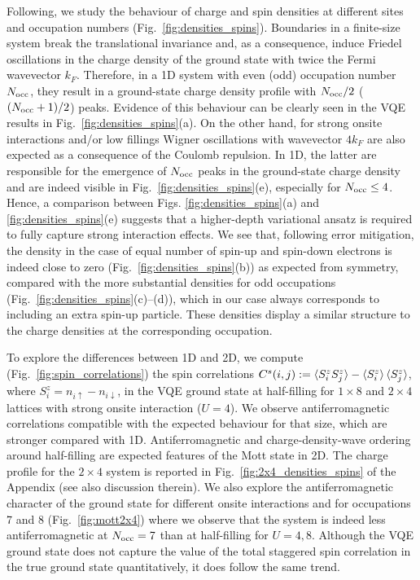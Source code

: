 \documentclass[aps,prb,twoside,superscriptaddress,longbibliography,nofootinbib,floatfix, notitlepage,twocolumn]{revtex4-1}
\newcommand{\Nocc}{N_{\rm{occ}}}
\begin{document}
Following, we study the behaviour of charge and spin densities at different sites and occupation numbers (Fig.~\ref{fig:densities_spins}). Boundaries in a finite-size system break the translational invariance and, as a consequence, induce Friedel oscillations in the charge density of the ground state\cite{Friedel1958} with twice the Fermi wavevector $k_F$. Therefore, in a 1D system with even (odd) occupation number $\Nocc$, they result in a ground-state charge density profile with $\Nocc/2$ ($(\Nocc+1)/2$) peaks. Evidence of this behaviour can be clearly seen in the VQE results in Fig.\ \ref{fig:densities_spins}(a). On the other hand, for strong onsite interactions and/or low fillings Wigner oscillations with wavevector $ 4k_F $ are also expected as a consequence of the Coulomb repulsion\cite{Schulz1993, Soffing2009}. In 1D, the latter are responsible for the emergence of $\Nocc$ peaks in the ground-state charge density and are indeed visible in Fig.\ \ref{fig:densities_spins}(e), especially for $ \Nocc \leq 4$. Hence, a comparison between Figs. \ref{fig:densities_spins}(a) and \ref{fig:densities_spins}(e) suggests that a higher-depth variational ansatz is required to fully capture strong interaction effects.
We see that, following error mitigation, the density in the case of equal number of spin-up and spin-down electrons is indeed close to zero (Fig.\ \ref{fig:densities_spins}(b)) as expected from symmetry, compared with the more substantial densities for odd occupations (Fig.\ \ref{fig:densities_spins}(c)--(d)), which in our case always corresponds to including an extra spin-up particle. These densities display a similar structure to the charge densities at the corresponding occupation.

To explore the differences between 1D and 2D, we compute (Fig.\ \ref{fig:spin_correlations})  the spin correlations $C^s(i,j) := \braket{S^z_i S^z_j} - \braket{S^z_i}\braket{S^z_j}$, where $S^z_i = n_{i\uparrow} - n_{i\downarrow}$, in the VQE ground state at half-filling for $1\times 8$ and $2\times 4$ lattices with strong onsite interaction ($U=4$).
We observe antiferromagnetic correlations compatible with the expected behaviour for that size, which are stronger compared with 1D. Antiferromagnetic and charge-density-wave ordering around half-filling are expected features of the Mott state in 2D. The charge profile for the $2\times 4$ system is reported in Fig.\ \ref{fig:2x4_densities_spins} of the Appendix (see also discussion therein). We also explore the antiferromagnetic character of the ground state for different onsite interactions and for occupations 7 and 8 (Fig.\ \ref{fig:mott2x4}) %
where we observe that the system is indeed less antiferromagnetic at $\Nocc =7$ than at half-filling for $U=4,8$. Although the VQE ground state does not capture the value of the total staggered spin correlation in the true ground state quantitatively, it does follow the same trend.
\end{document}
